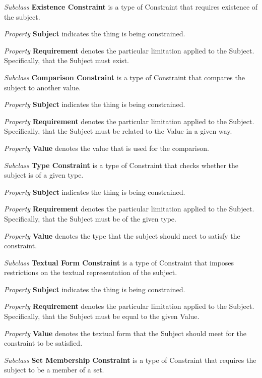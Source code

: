 \documentclass[parskip=full]{uvamscse}
\begin{document}
\begin{description}
\item\textit{Subclass} \textbf{Existence Constraint} is a type of Constraint that requires existence of the subject. 

\textit{Property} \textbf{Subject} indicates the thing is being constrained.

\textit{Property} \textbf{Requirement} denotes the particular limitation applied to the Subject. Specifically, that the Subject must exist.


\item\textit{Subclass} \textbf{Comparison Constraint} is a type of Constraint that compares the subject to another value.

\textit{Property} \textbf{Subject} indicates the thing is being constrained.

\textit{Property} \textbf{Requirement} denotes the particular limitation applied to the Subject. Specifically, that the Subject must be related to the Value in a given way.

\textit{Property} \textbf{Value} denotes the value that is used for the comparison.


\item\textit{Subclass} \textbf{Type Constraint} is a type of Constraint that checks whether the subject is of a given type.

\textit{Property} \textbf{Subject} indicates the thing is being constrained.

\textit{Property} \textbf{Requirement} denotes the particular limitation applied to the Subject. Specifically, that the Subject must be of the given type.

\textit{Property} \textbf{Value} denotes the type that the subject should meet to satisfy the constraint.


\item\textit{Subclass} \textbf{Textual Form Constraint} is a type of Constraint that imposes restrictions on the textual representation of the subject.

\textit{Property} \textbf{Subject} indicates the thing is being constrained.

\textit{Property} \textbf{Requirement} denotes the particular limitation applied to the Subject. Specifically, that the Subject must be equal to the given Value.

\textit{Property} \textbf{Value} denotes the textual form that the Subject should meet for the constraint to be satisfied.


\item\textit{Subclass} \textbf{Set Membership Constraint} is a type of Constraint that requires the subject to be a member of a set.


\end{description}
\end{document}
